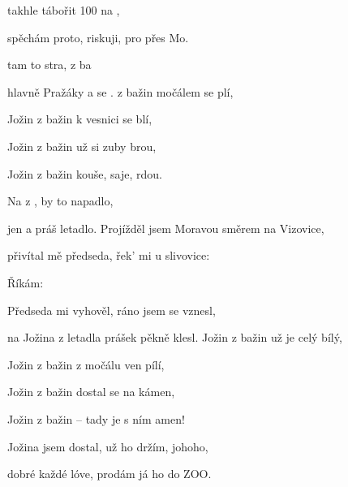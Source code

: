 
\zs
{} takhle tábořit  100 na ,

spěchám proto, riskuji, pro přes Mo.

 tam to stra,  z ba

 hlavně Pražáky a  se .
\ks
\zr
{} z bažin močálem se plí,

Jožin z bažin k vesnici se blí,

Jožin z bažin už si zuby brou,

Jožin z bažin kouše, saje, rdou.

Na  z ,  by to napadlo,

 jen a  práš letadlo.  
\kr
\zs
Projížděl jsem Moravou směrem na Vizovice,

přivítal mě předseda, řek' mi u slivovice:

\ks
\zr  \kr
\zs
Říkám: 

Předseda mi vyhověl, ráno jsem se vznesl,

na Jožina z letadla prášek pěkně klesl.
\ks
\zr
Jožin z bažin už je celý bílý,

Jožin z bažin z močálu ven pílí,

Jožin z bažin dostal se na kámen,

Jožin z bažin -- tady je s ním amen!

Jožina jsem dostal, už ho držím, johoho,

dobré každé lóve, prodám já ho do ZOO.
\kr
\kp






